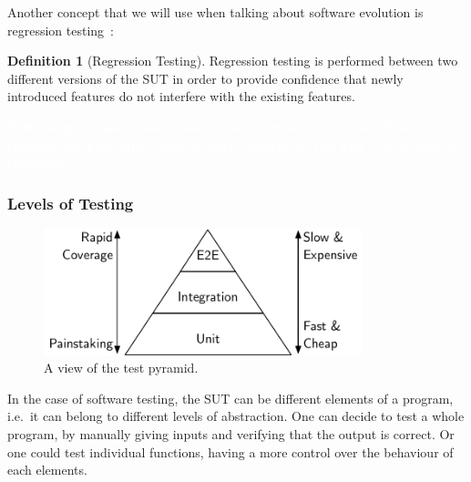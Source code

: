 \documentclass[11pt]{sdm_internship}
\newcommand{\todo}[1]{\colorbox{Red!75}{\textcolor{white}{\textbf{TODO\ifx&#1&\else: #1\fi}}}}
\theoremstyle{definition}
\newtheorem{definition}{Definition}[section]
\begin{document}
Another concept that we will use when talking about software evolution is regression testing~\cite{yoo2012regression}:
\begin{definition}[Regression Testing]
  Regression testing is performed between two different versions of the SUT in order to provide confidence that newly introduced features do not interfere with the existing features.
\end{definition}

\todo{give some clues to each concept to tell why it is a field of research?}

\subsubsection{Levels of Testing}%
\label{sssec:levels_testing}
\begin{figure}
  \centering
  \includegraphics[width=25em]{test_pyramid}
  \caption{A view of the test pyramid.}%
  \label{fig:test_pyramid}
\end{figure}

In the case of software testing, the SUT can be different elements of a program, i.e.\ it can belong to different levels of abstraction.
One can decide to test a whole program, by manually giving inputs and verifying that the output is correct.
Or one could test individual functions, having a more control over the behaviour of each elements.
\end{document}
